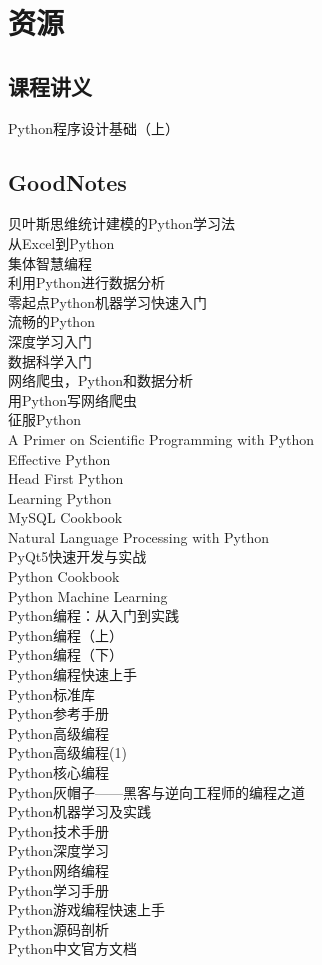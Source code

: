 \documentclass{book}%
\begin{document}
	\chapter{资源}
	
	\section{课程讲义}
	Python程序设计基础（上）\\
	
	\section{GoodNotes}
	贝叶斯思维统计建模的Python学习法\\
	从Excel到Python\\
	集体智慧编程\\
	利用Python进行数据分析\\
	零起点Python机器学习快速入门\\
	流畅的Python\\
	深度学习入门\\
	数据科学入门\\
	网络爬虫，Python和数据分析\\
	用Python写网络爬虫\\
	征服Python\\
	A Primer on Scientific Programming with Python\\
	Effective Python\\
	Head First Python\\
	Learning Python\\
	MySQL Cookbook\\
	Natural Language Processing with Python\\
	PyQt5快速开发与实战\\
	Python Cookbook\\
	Python Machine Learning\\
	Python编程：从入门到实践\\
	Python编程（上）\\
	Python编程（下）\\
	Python编程快速上手\\
	Python标准库\\
	Python参考手册\\
	Python高级编程\\
	Python高级编程(1)\\
	Python核心编程\\
	Python灰帽子——黑客与逆向工程师的编程之道\\
	Python机器学习及实践\\
	Python技术手册\\
	Python深度学习\\
	Python网络编程\\
	Python学习手册\\
	Python游戏编程快速上手\\
	Python源码剖析\\
	Python中文官方文档\\
	
\end{document}

